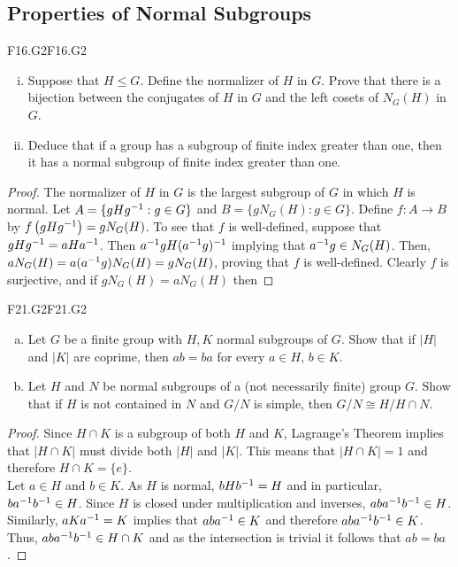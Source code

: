 \documentclass[../AlgebraQualSolutions.tex]{subfiles}
\begin{document}
\subsection{Properties of Normal Subgroups}

	\begin{prob}{F16.G2}{F16.G2}
		\begin{enumerate}[(i)]
			\item Suppose that $H \leq G$. Define the normalizer of $H$ in $G$. Prove that there is a bijection between the conjugates of $H$ in $G$ and the left cosets of $N_G(H)$ in $G$.
			\item Deduce that if a group has a subgroup of finite index greater than one, then it has a normal subgroup of finite index greater than one.
		\end{enumerate}
	\end{prob}

	\begin{proof}
		The normalizer of $H$ in $G$ is the largest subgroup of $G$ in which $H$ is normal. Let $A = \{gHg^{-1}: g \in G\}$ and $B = \{gN_G(H): g \in G\}$. Define $f: A \to B$ by $f\left(gHg^{-1}\right) = gN_G(H)$. To see that $f$ is well-defined, suppose that $gHg^{-1} = aHa^{-1}$. Then $a^{-1} g H  (a^{-1} g)^{-1}$ implying that $a^{-1} g \in N_G(H)$. Then, $aN_G(H) = a(a^{-1} g)N_G(H) = gN_G(H)$, proving that  $f$ is well-defined. Clearly $f$ is surjective, and if $gN_G(H) = aN_G(H)$ then 
	\end{proof}

	\begin{prob}{F21.G2}{F21.G2}
	\begin{enumerate}[(a)]
	\item Let $G$ be a finite group with $H,K$ normal subgroups of $G$. Show that if $|H|$ and $|K|$ are coprime, then $ab = ba$ for every $a \in H$, $b \in K$.
	\item Let $H$ and $N$ be normal subgroups of a (not necessarily finite) group $G$. Show that if $H$ is not contained in $N$ and $G/N$ is simple, then $G/N \cong H/H\cap N$.
	\end{enumerate}
	\end{prob}
	
	\begin{proof}
	Since  $H \cap K$ is a subgroup of both $H$ and $K$, Lagrange's Theorem implies that $|H \cap K|$ must divide both $|H|$ and $|K|$. This means that $|H \cap K| =1$ and therefore $H \cap K = \{e\}$.\\
	
	Let $a \in H$ and $b \in K$. As $H$ is normal, $bHb^{-1} = H$ and in particular, $ba^{-1} b^{-1} \in H$. Since $H$ is closed under multiplication and inverses, $aba^{-1} b^{-1} \in H$. Similarly, $aK a^{-1} = K$ implies that $aba^{-1} \in K$ and therefore $aba^{-1} b^{-1} \in K$. Thus, $aba^{-1} b^{-1} \in H \cap K$ and as the intersection is trivial it follows that $ab =ba$.
	\end{proof}
	
\end{document}
